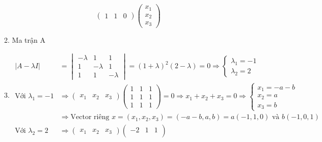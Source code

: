 \begin{enumerate}
\begin{enumerate}
\begin{equation*}
\begin{pmatrix}
                1 & 1 & 0
            \end{pmatrix}
            \begin{pmatrix}
                x_1\\
                x_2\\
                x_3
            \end{pmatrix}
        \end{equation*}
        \item Ma trận A
        \item \begin{align*}
            |A - \lambda I| &= \begin{vmatrix}
                -\lambda & 1 & 1\\
                1 & -\lambda & 1\\
                1 & 1 & -\lambda
            \end{vmatrix} = (1+\lambda)^2(2 - \lambda) = 0 \Rightarrow \begin{cases}
                \lambda_1 = -1\\
                \lambda_2 = 2
            \end{cases}\\
            \textrm{Với } \lambda_1 = -1 &\Rightarrow \begin{pmatrix}
                x_1 & x_2 & x_3
            \end{pmatrix}
            \begin{pmatrix}
                1 & 1 & 1\\
                1 & 1 & 1\\
                1 & 1 & 1
            \end{pmatrix} = 0 \Rightarrow x_1 + x_2 + x_3 = 0 \Rightarrow
            \begin{cases}
                x_1 = -a-b\\
                x_2 = a\\
                x_3 = b
            \end{cases}\\
            &\Rightarrow \textrm{Vector riêng } x = (x_1, x_2, x_3) = (-a-b, a, b) = a(-1, 1, 0) \textrm{ và } b(-1, 0, 1)\\
            \textrm{Với } \lambda_2 = 2 &\Rightarrow \begin{pmatrix}
                x_1 & x_2 & x_3
            \end{pmatrix}
            \begin{pmatrix}
                -2 & 1 & 1\\

\end{pmatrix}
\end{align*}
\end{enumerate}
\end{enumerate}
